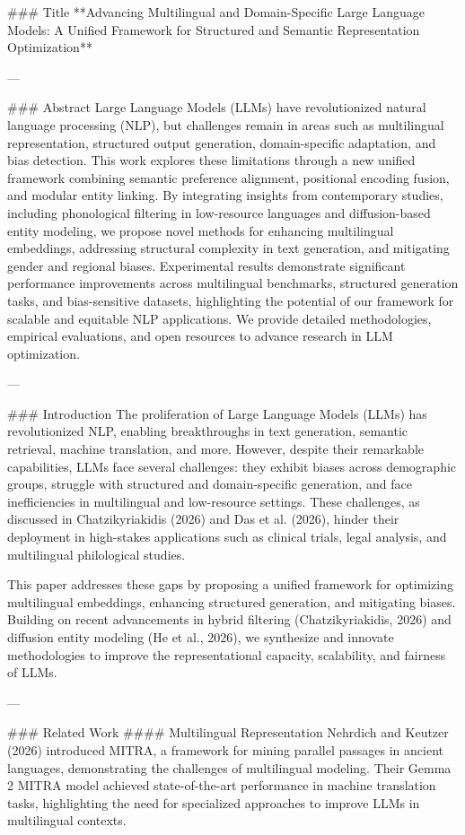 ### Title
**Advancing Multilingual and Domain-Specific Large Language Models: A Unified Framework for Structured and Semantic Representation Optimization**

---

### Abstract
Large Language Models (LLMs) have revolutionized natural language processing (NLP), but challenges remain in areas such as multilingual representation, structured output generation, domain-specific adaptation, and bias detection. This work explores these limitations through a new unified framework combining semantic preference alignment, positional encoding fusion, and modular entity linking. By integrating insights from contemporary studies, including phonological filtering in low-resource languages and diffusion-based entity modeling, we propose novel methods for enhancing multilingual embeddings, addressing structural complexity in text generation, and mitigating gender and regional biases. Experimental results demonstrate significant performance improvements across multilingual benchmarks, structured generation tasks, and bias-sensitive datasets, highlighting the potential of our framework for scalable and equitable NLP applications. We provide detailed methodologies, empirical evaluations, and open resources to advance research in LLM optimization.

---

### Introduction
The proliferation of Large Language Models (LLMs) has revolutionized NLP, enabling breakthroughs in text generation, semantic retrieval, machine translation, and more. However, despite their remarkable capabilities, LLMs face several challenges: they exhibit biases across demographic groups, struggle with structured and domain-specific generation, and face inefficiencies in multilingual and low-resource settings. These challenges, as discussed in Chatzikyriakidis (2026) and Das et al. (2026), hinder their deployment in high-stakes applications such as clinical trials, legal analysis, and multilingual philological studies.

This paper addresses these gaps by proposing a unified framework for optimizing multilingual embeddings, enhancing structured generation, and mitigating biases. Building on recent advancements in hybrid filtering (Chatzikyriakidis, 2026) and diffusion entity modeling (He et al., 2026), we synthesize and innovate methodologies to improve the representational capacity, scalability, and fairness of LLMs.

---

### Related Work
#### Multilingual Representation
Nehrdich and Keutzer (2026) introduced MITRA, a framework for mining parallel passages in ancient languages, demonstrating the challenges of multilingual modeling. Their Gemma 2 MITRA model achieved state-of-the-art performance in machine translation tasks, highlighting the need for specialized approaches to improve LLMs in multilingual contexts.

